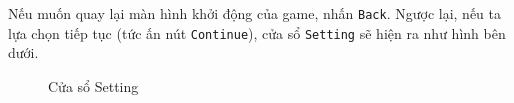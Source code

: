 Nếu muốn quay lại màn hình khởi động của game, nhấn \verb|Back|. Ngược lại, nếu ta lựa chọn tiếp tục (tức ấn nút \verb|Continue|), cửa sổ \verb|Setting| sẽ hiện ra như hình bên dưới.
\begin{figure}[H]
\caption{Cửa sổ Setting}
\end{figure}

